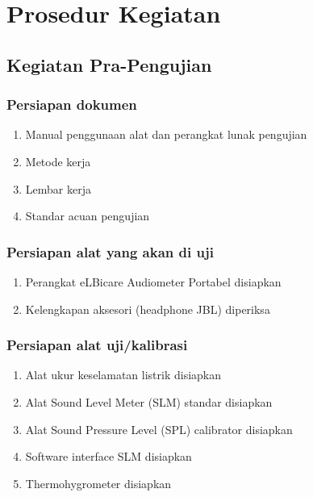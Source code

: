 \documentclass{article}
\begin{document}
	\section{Prosedur Kegiatan}
	
	\subsection{Kegiatan Pra-Pengujian}
	
	\subsubsection{Persiapan dokumen}
	\begin{enumerate}
		\item Manual penggunaan alat dan perangkat lunak pengujian
		\item Metode kerja
		\item Lembar kerja
		\item Standar acuan pengujian
	\end{enumerate}

	\subsubsection{Persiapan alat yang akan di uji}
	\begin{enumerate}
		\item Perangkat eLBicare Audiometer Portabel disiapkan
		\item Kelengkapan aksesori (headphone JBL) diperiksa
	\end{enumerate}
	
	\subsubsection{Persiapan alat uji/kalibrasi}
	\begin{enumerate}
		\item Alat ukur keselamatan listrik disiapkan
		\item Alat Sound Level Meter (SLM) standar disiapkan
		\item Alat Sound Pressure Level (SPL) calibrator disiapkan
		\item Software interface SLM disiapkan
		\item Thermohygrometer disiapkan
	\end{enumerate}
	
\end{document}
